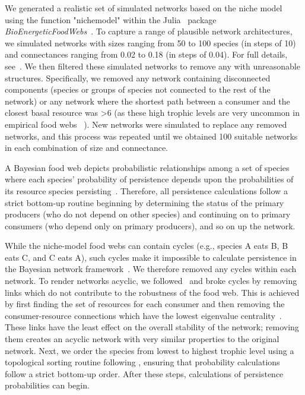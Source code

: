 \documentclass[12pt]{article}
\begin{document}
\begin{spacing}{2.0}
		We generated a realistic set of simulated networks based on the niche model~\citep{Williams2000,Stouffer2007} using the function "nichemodel" within the Julia~\citep{Julia} package \emph{BioEnergeticFoodWebs}~\citep{bioenergfw,Delmas2017}. 
		To capture a range of plausible network architectures, we simulated networks with sizes ranging from 50 to 100 species (in steps of 10) and connectances ranging from 0.02 to 0.18 (in steps of 0.04). 
		For full details, see~\citet{Cirtwill2021_inprep}.
        We then filtered these simulated networks to remove any with unreasonable structures.
		Specifically, we removed any network containing disconnected components (species or groups of species not connected to the rest of the network) or any network where the shortest path between a consumer and the closest basal resource was \textgreater6 (as these high trophic levels are very uncommon in empirical food webs ~\citep{}).
		New networks were simulated to replace any removed networks, and this process was repeated until we obtained 100 suitable networks in each combination of size and connectance.
              
		A Bayesian food web depicts probabilistic relationships among a set of species where each species' probability of persistence depends upon the probabilities of its resource species persisting~\citep{Jensen_Nielsen,Eklof2013}. 
		Therefore, all persistence calculations follow a strict bottom-up routine beginning by determining the status of the primary producers (who do not depend on other species) and continuing on to primary consumers (who depend only on primary producers), and so on up the network.
		
		While the niche-model food webs can contain cycles (e.g., species A eats B, B eats C, and C eats A), such cycles make it impossible to calculate persistence in the Bayesian network framework~\citep{Tarjan1972}. We therefore removed any cycles within each network.
		To render networks acyclic, we followed~\citet{Allesina2009} and broke cycles by removing links which do not contribute to the robustness of the food web.
		This is achieved by first finding the set of resources for each consumer and then removing the consumer-resource connections which have the lowest eigenvalue centrality~\citep{Allesina2009}.
		These links have the least effect on the overall stability of the network; removing them creates an acyclic network with very similar properties to the original network.
		Next, we order the species from lowest to highest trophic level using a topological sorting routine following \citep{Tarjan1972, Allesinaetal2005}, ensuring that probability calculations follow a strict bottom-up order. 
        After these steps, calculations of persistence probabilities can begin.


\end{spacing}
\end{document}
